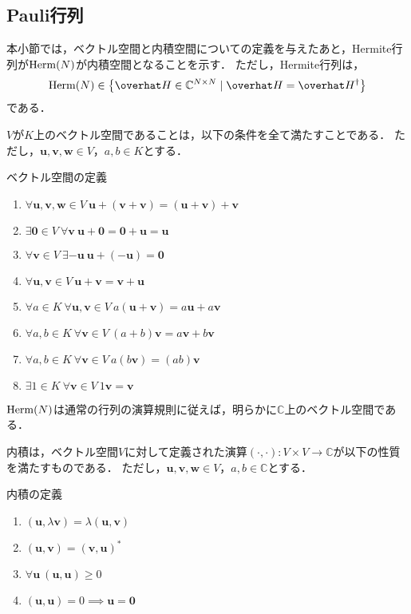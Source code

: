 \documentclass{report}
\begin{document}
  \subsection{Pauli行列}
    本小節では，ベクトル空間と内積空間についての定義を与えたあと，Hermite行列が$\mathrm{Herm}(N)$が内積空間となることを示す．
    ただし，Hermite行列は，
    \begin{align}
      \r{Herm}(N) \in \qty{\hat{H} \in \mathbb{C}^{N\times N} \mid \hat{H} = \hat{H}^{\dag}}
    \end{align}
    である．
    \par
    $V$が$K$上のベクトル空間であることは，以下の条件を全て満たすことである．
    ただし，$\bm{u}, \bm{v}, \bm{w} \in V$，$a, b \in K$とする．
    \begin{itembox}[l]{ベクトル空間の定義}
      \begin{enumerate}
        \item $\forall \bm{u}, \bm{v}, \bm{w} \in V\ \bm{u} + (\bm{v} + \bm{v}) = (\bm{u} + \bm{v}) + \bm{v}$
        \item $\exists \bm{0} \in V\ \forall \bm{v}\ \bm{u} + \bm{0} = \bm{0} + \bm{u} = \bm{u} $
        \item $\forall \bm{v} \in V\ \exists -\bm{u}\ \bm{u} + (-\bm{u}) = \bm{0}$
        \item $\forall \bm{u}, \bm{v} \in V\ \bm{u} + \bm{v} = \bm{v} + \bm{u}$
        \item $\forall a \in K\ \forall \bm{u}, \bm{v} \in V\ a(\bm{u} + \bm{v}) = a\bm{u} + a\bm{v}$
        \item $\forall a, b \in K\ \forall \bm{v} \in V\ (a + b)\bm{v} = a\bm{v} + b\bm{v}$
        \item $\forall a, b \in K\ \forall \bm{v} \in V\ a(b\bm{v}) = (ab)\bm{v}$
        \item $\exists 1 \in K\ \forall \bm{v} \in V\ 1\bm{v} = \bm{v}$
      \end{enumerate}
    \end{itembox}
    $\mathrm{Herm}(N)$は通常の行列の演算規則に従えば，明らかに$\mathbb{C}$上のベクトル空間である．
    \par
    内積は，ベクトル空間$V$に対して定義された演算$(\cdot, \cdot): V\times V \to \mathbb{C}$が以下の性質を満たすものである．
    ただし，$\bm{u}, \bm{v}, \bm{w} \in V$，$a, b \in \mathbb{C}$とする．
    \begin{itembox}[l]{内積の定義}
      \begin{enumerate}
        \item $(\bm{u}, \lambda \bm{v}) = \lambda (\bm{u}, \bm{v})$
        \item $(\bm{u}, \bm{v}) = (\bm{v}, \bm{u})^*$
        \item $\forall \bm{u}\ (\bm{u}, \bm{u}) \geq 0$
        \item $(\bm{u}, \bm{u}) = 0 \implies \bm{u} = \bm{0}$
      \end{enumerate}
    \end{itembox}
\end{document}

